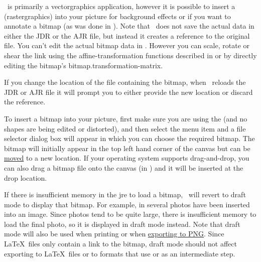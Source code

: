 
\FlowframTk\ is primarily a \gls{vectorgraphics} application,
however it is possible to insert a 
(\gls{rastergraphics}) into your picture for background effects or
if you want to annotate a \gls{bitmap} (as was done in
).  Note that
\FlowframTk\ does not save the actual  data in either
the \gls{JDR} or the \gls{AJR} file, but instead it creates a reference
to the original file. You can't edit the actual bitmap data in
\FlowframTk. However you can scale, rotate or shear the link
using the \gls{affine-transformation} functions described in 
 or by directly editing the
bitmap's \gls{bitmap.transformation-matrix}. 

\begin{important}
If you change the location of the file containing the bitmap, when
\FlowframTk\ reloads the \gls*{JDR} or \gls*{AJR} file it will
prompt you to either provide the new location or discard the reference.
\end{important}


To insert a \gls{bitmap} into your picture, first make sure you are using
the  (and no shapes are
being edited or distorted), and then select the menu item
 and a file selector dialog box will appear in which
you can choose the required \gls{bitmap}. The \gls{bitmap} will initially appear
in the top left hand corner of the \gls{canvas} but can be
\hyperref[sec:moveobjects]{moved} to a new location.  If your
operating system supports \gls{drag-and-drop}, you can also drag a
\gls{bitmap} file onto the \gls{canvas} (in \selectmode) and it will
be inserted at the drop location.

If there is insufficient memory in the \gls{jre} to load a bitmap,
\FlowframTk\ will revert to draft mode to display that bitmap.  For
example, in  several photos have been
inserted into an image. Since photos tend to be quite large, there
is insufficient memory to load the final photo, so it is displayed
in draft mode instead. Note that draft mode will also be used when
printing or when \hyperref[sec:exportpng]{exporting to PNG}. Since \LaTeX\ files
only contain a link to the bitmap, draft mode should not affect
exporting to \LaTeX\ files or to formats that use  or
 as an intermediate step.

